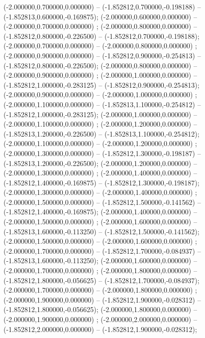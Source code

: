  (-2.000000,0.700000,0.000000) -- (-1.852812,0.700000,-0.198188) -- (-1.852813,0.600000,-0.169875);
 (-2.000000,0.600000,0.000000) -- (-2.000000,0.700000,0.000000) ;
 (-2.000000,0.800000,0.000000) -- (-1.852812,0.800000,-0.226500) -- (-1.852812,0.700000,-0.198188);
 (-2.000000,0.700000,0.000000) -- (-2.000000,0.800000,0.000000) ;
 (-2.000000,0.900000,0.000000) -- (-1.852812,0.900000,-0.254813) -- (-1.852812,0.800000,-0.226500);
 (-2.000000,0.800000,0.000000) -- (-2.000000,0.900000,0.000000) ;
 (-2.000000,1.000000,0.000000) -- (-1.852812,1.000000,-0.283125) -- (-1.852812,0.900000,-0.254813);
 (-2.000000,0.900000,0.000000) -- (-2.000000,1.000000,0.000000) ;
 (-2.000000,1.100000,0.000000) -- (-1.852813,1.100000,-0.254812) -- (-1.852812,1.000000,-0.283125);
 (-2.000000,1.000000,0.000000) -- (-2.000000,1.100000,0.000000) ;
 (-2.000000,1.200000,0.000000) -- (-1.852813,1.200000,-0.226500) -- (-1.852813,1.100000,-0.254812);
 (-2.000000,1.100000,0.000000) -- (-2.000000,1.200000,0.000000) ;
 (-2.000000,1.300000,0.000000) -- (-1.852812,1.300000,-0.198187) -- (-1.852813,1.200000,-0.226500);
 (-2.000000,1.200000,0.000000) -- (-2.000000,1.300000,0.000000) ;
 (-2.000000,1.400000,0.000000) -- (-1.852812,1.400000,-0.169875) -- (-1.852812,1.300000,-0.198187);
 (-2.000000,1.300000,0.000000) -- (-2.000000,1.400000,0.000000) ;
 (-2.000000,1.500000,0.000000) -- (-1.852812,1.500000,-0.141562) -- (-1.852812,1.400000,-0.169875);
 (-2.000000,1.400000,0.000000) -- (-2.000000,1.500000,0.000000) ;
 (-2.000000,1.600000,0.000000) -- (-1.852813,1.600000,-0.113250) -- (-1.852812,1.500000,-0.141562);
 (-2.000000,1.500000,0.000000) -- (-2.000000,1.600000,0.000000) ;
 (-2.000000,1.700000,0.000000) -- (-1.852812,1.700000,-0.084937) -- (-1.852813,1.600000,-0.113250);
 (-2.000000,1.600000,0.000000) -- (-2.000000,1.700000,0.000000) ;
 (-2.000000,1.800000,0.000000) -- (-1.852812,1.800000,-0.056625) -- (-1.852812,1.700000,-0.084937);
 (-2.000000,1.700000,0.000000) -- (-2.000000,1.800000,0.000000) ;
 (-2.000000,1.900000,0.000000) -- (-1.852812,1.900000,-0.028312) -- (-1.852812,1.800000,-0.056625);
 (-2.000000,1.800000,0.000000) -- (-2.000000,1.900000,0.000000) ;
 (-2.000000,2.000000,0.000000) -- (-1.852812,2.000000,0.000000) -- (-1.852812,1.900000,-0.028312);
